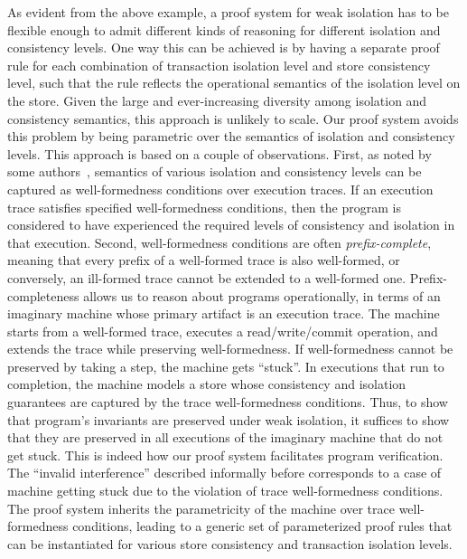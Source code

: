As evident from the above example, a proof system for weak isolation
has to be flexible enough to admit different kinds of reasoning for
different isolation and consistency levels. One way this can be
achieved is by having a separate proof rule for each combination of
transaction isolation level and store consistency level, such that the
rule reflects the operational semantics of the isolation level on the
store. Given the large and ever-increasing diversity among isolation
and consistency semantics, this approach is unlikely to scale. Our
proof system avoids this problem by being parametric over the
semantics of isolation and consistency levels. This approach is based
on a couple of observations. First, as noted by some
authors~\cite{pldi15,gotsmanconcur15}, semantics of various isolation
and consistency levels can be captured as well-formedness conditions
over execution traces. If an execution trace satisfies specified
well-formedness conditions, then the program is considered to have
experienced the required levels of consistency and isolation in that
execution. Second, well-formedness conditions are often
\emph{prefix-complete}, meaning that every prefix of a well-formed
trace is also well-formed, or conversely, an ill-formed trace cannot
be extended to a well-formed one. Prefix-completeness allows us to
reason about programs operationally, in terms of an imaginary machine
whose primary artifact is an execution trace. The machine starts from
a well-formed trace, executes a read/write/commit operation, and
extends the trace while preserving well-formedness. If well-formedness
cannot be preserved by taking a step, the machine gets ``stuck''. In
executions that run to completion, the machine models a store whose
consistency and isolation guarantees are captured by the trace
well-formedness conditions. Thus, to show that program's invariants
are preserved under weak isolation, it suffices to show that they are
preserved in all executions of the imaginary machine that do not get
stuck. This is indeed how our proof system facilitates program
verification. The ``invalid interference'' described informally before
corresponds to a case of machine getting stuck due to the violation of
trace well-formedness conditions. The proof system inherits the
parametricity of the machine over trace well-formedness conditions,
leading to a generic set of parameterized proof rules that can be
instantiated for various store consistency and transaction isolation
levels.

